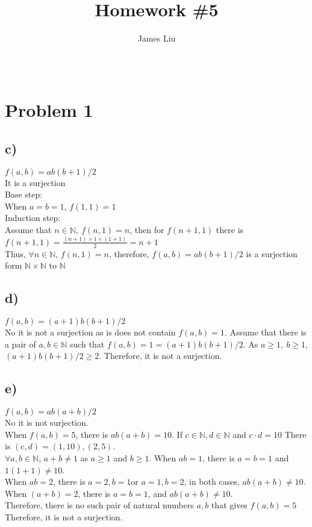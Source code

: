 \documentclass{article}
\title{\textbf{Homework \#5 }}
\author{James Liu}
\date{\ }
\begin{document}
\maketitle

\section*{Problem 1}
\subsection*{c)}
    \(f(a,b)=ab(b+1)/2\)\\
    It is a surjection\\
    Base step:\\
    When \(a=b=1\), \(f(1,1)=1\)\\
    Induction step:\\
    Assume that \(n\in \mathbb{N}, \ f(n,1)=n\), then for \(f(n+1,1)\)
    there is \(f(n+1,1)=\frac{(n+1)\times 1 \times (1+1)}{2}=n+1\)\\
    Thus, \(\forall n\in \mathbb{N}\), \(f(n,1)=n\), therefore, \(f(a,b)=ab(b+1)/2\) is a surjection form  \(\mathbb{N}\times \mathbb{N}\) to \(\mathbb{N}\)
\subsection*{d)}
    \(f(a,b)=(a+1)b(b+1)/2\)\\
    No it is not a surjection as is does not contain \(f(a,b)=1\).
    Assume that there is a pair of \(a,b\in \mathbb{N}\) such that \(f(a,b)=1=(a+1)b(b+1)/2\). 
    As \(a\geqslant 1, \ b\geqslant 1\), \((a+1)b(b+1)/2\geqslant 2\). Therefore, it is not a surjection.
\subsection*{e)}
    \(f(a,b)=ab(a+b)/2\)\\
    No it is not surjection.\\
    When \(f(a,b)=5\), there is \(ab(a+b)=10\). If \(c\in \mathbb{N}, d\in \mathbb{N}\) and \(c\cdot d =10\)
    There is \((c,d)=(1,10),(2,5)\). \\
    \(\forall a,b\in \mathbb{N}\), \(a+b\neq 1\) as \(a\geqslant 1\) and \(b\geqslant 1\).
    When \(ab=1\), there is \(a=b=1\) and \(1(1+1)\neq 10\).\\
    When \(ab=2\), there is \(a=2,b=1\)or \(a=1,b=2\), in both cases, \(ab(a+b)\neq 10\).\\
    When \((a+b)=2\), there is \(a=b=1\), and \(ab(a+b)\neq 10\).\\
    Therefore, there is no such pair of natural numbers \(a,b\) that gives \(f(a,b)=5\) Therefore, it is not a surjection.
\end{document}
